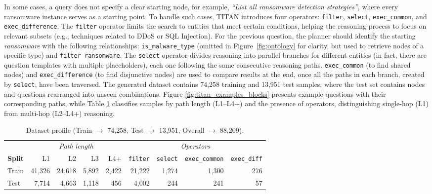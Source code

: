\documentclass[11pt]{article}
\begin{document}
In some cases, a query does not specify a clear starting node, for example, \textit{“List all ransomware detection strategies”}, where every ransomware instance serves as a starting point. To handle such cases, TITAN introduces four operators: \texttt{filter}, \texttt{select}, \texttt{exec\_common}, and \texttt{exec\_difference}. The \texttt{filter} operator limits the search to entities that meet certain conditions, helping the reasoning process to focus on relevant subsets (e.g., techniques related to DDoS or SQL Injection). For the previous question, the planner should identify the starting \textit{ransomware} with the following relationships: \texttt{is\_malware\_type} (omitted in Figure~\ref{fig:ontology} for clarity, but used to retrieve nodes of a specific type) and \texttt{filter ransomware}. The \texttt{select} operator divides reasoning into parallel branches for different entities (in fact, there are question templates with multiple placeholders), each one following the same consecutive reasoning paths. 
\texttt{exec\_common} (to find shared nodes) and \texttt{exec\_difference} (to find disjunctive nodes) are used to compare results at the end, once all the paths in each branch, created by \texttt{select}, have been traversed. The generated dataset contains 74{,}258 training and 13{,}951 test samples, where the test set contains nodes and questions rearranged into unseen combinations. Figure \ref{fig:titan_examples_blocks} presents example questions with their corresponding paths, while Table \ref{tab:fine_profile_transposed} classifies samples by path length (L1–L4+) and the presence of operators, distinguishing single-hop (L1) from multi-hop (L2–L4+) reasoning.
\begin{table}[t]
\centering
\small
\setlength{\tabcolsep}{4pt}
\begin{tabular}{@{}lrrrr|rrrr@{}}
\toprule
& \multicolumn{4}{c}{\textit{Path length}} & \multicolumn{4}{c}{\textit{Operators}} \\
\cmidrule(lr){2-5}\cmidrule(lr){6-9}
\textbf{Split} & L1 & L2 & L3 & L4+ & \texttt{filter} & \texttt{select} & \texttt{exec\_common} & \texttt{exec\_diff} \\
\midrule
Train & 41{,}326 & 24{,}618 & 5{,}892 & 2{,}422 & 21{,}222 & 1{,}274 & 1{,}300 & 276 \\
Test  & 7{,}714  & 4{,}663  & 1{,}118 & 456   & 4{,}002  & 244   & 241   & 57 \\
\bottomrule
\end{tabular}
\caption{\footnotesize Dataset profile (Train $\xrightarrow{}$ 74{,}258, Test $\xrightarrow{}$ 13{,}951, Overall $\xrightarrow{}$ 88{,}209).}
\label{tab:fine_profile_transposed}
\end{table}
\end{document}
